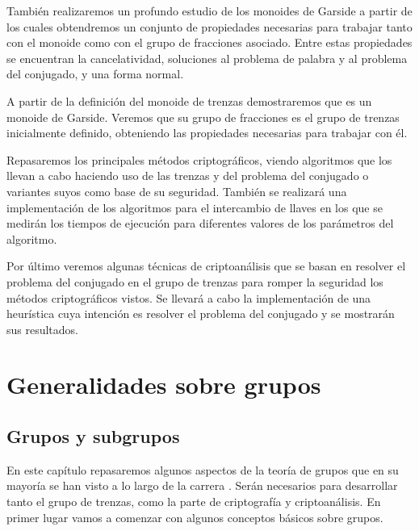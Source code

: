 \documentclass[12pt]{book}
\theoremstyle{definition}
\begin{document}
También realizaremos un profundo estudio de los monoides de Garside a partir de los cuales obtendremos un conjunto de propiedades necesarias para trabajar tanto con el monoide como con el grupo de fracciones asociado. Entre estas propiedades se encuentran la cancelatividad, soluciones al problema de palabra y al problema del conjugado, y una forma normal.

A partir de la definición del monoide de trenzas demostraremos que es un monoide de Garside. Veremos que su grupo de fracciones es el grupo de trenzas inicialmente definido, obteniendo las propiedades necesarias para trabajar con él.

Repasaremos los principales métodos criptográficos, viendo algoritmos que los llevan a cabo haciendo uso de las trenzas y del problema del conjugado o variantes suyos como base de su seguridad. También se realizará una implementación de los algoritmos para el intercambio de llaves en los que se medirán los tiempos de ejecución para diferentes valores de los parámetros del algoritmo.

Por último veremos algunas técnicas de criptoanálisis que se basan en resolver el problema del conjugado en el grupo de trenzas para romper la seguridad los métodos criptográficos vistos. Se llevará a cabo la implementación de una heurística cuya intención es resolver el problema del conjugado y se mostrarán sus resultados.
\chapter{Generalidades sobre grupos}
\section{Grupos y subgrupos}
\label{sec:grupos}
En este capítulo repasaremos algunos aspectos de la teoría de grupos que en su mayoría se han visto a lo largo de la carrera \cite{group, wiki, alg_abs, free}. Serán necesarios para desarrollar tanto el grupo de trenzas, como la parte de criptografía y criptoanálisis. En primer lugar vamos a comenzar con algunos conceptos básicos sobre grupos.
\end{document}
